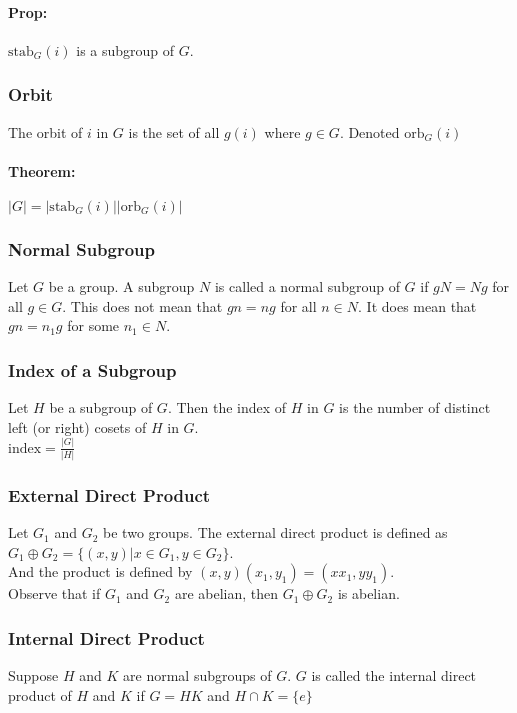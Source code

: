\documentclass[11pt, twoside, letterpaper]{article}
\newcommand{\ord}[1]{|{#1}|}
\newcommand{\stab}{\mathrm{stab}}
\newcommand{\orb}{\mathrm{orb}}
\begin{document}
		\paragraph{Prop: }
			$\stab_G(i)$ is a subgroup of $G$.

\subsubsection{Orbit}
	The orbit of $i$ in $G$ is the set of all $g(i)$ where $g \in G$.
	Denoted $\orb_G(i)$

\paragraph{Theorem: }
	$\ord{G} = \ord{\stab_G(i)} \ord{\orb_G(i)}$


\subsubsection{Normal Subgroup}
	Let $G$ be a group.
	A subgroup $N$ is called a normal subgroup of $G$ if $gN = Ng$ for all $g \in G$.
	This does not mean that $gn = ng$ for all $n \in N$.
	It does mean that $gn = n_1 g$ for some $n_1 \in N.$

\subsubsection{Index of a Subgroup}
	Let $H$ be a subgroup of $G$.
	Then the index of $H$ in $G$ is the number of distinct left (or right) cosets of $H$ in $G$. \\
	$\text{index} = \frac{\ord{G}}{\ord{H}}$



\subsubsection{External Direct Product}
	Let $G_1$ and $G_2$ be two groups.
	The external direct product is defined as \\
	$G_1 \oplus G_2 = \{ (x, y) | x \in G_1, y \in G_2 \}$.\\
	And the product is defined by $(x, y)(x_1, y_1) = (xx_1, yy_1)$.\\
	Observe that if $G_1$ and $G_2$ are abelian, then $G_1 \oplus G_2$ is abelian.

\subsubsection{Internal Direct Product}
	Suppose $H$ and $K$ are normal subgroups of $G$.
	$G$ is called the internal direct product of $H$ and $K$ if $G = HK$ and $ H \cap K = \{ e \}$
\end{document}
